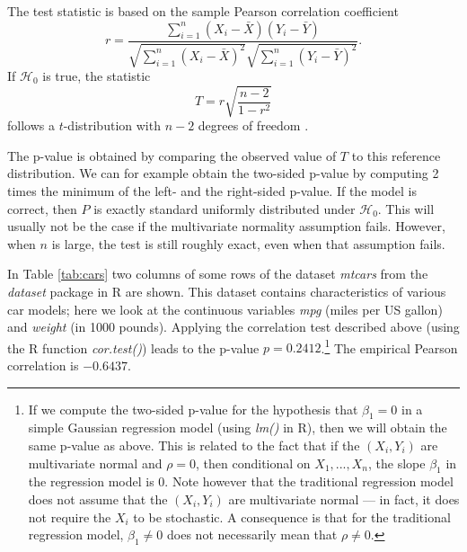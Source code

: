 \documentclass[11pt]{article}
\theoremstyle{plain}
\theoremstyle{definition}
\newcommand{\Hy}{\mathcal{H}}
\newcommand{\citp}{\citep}
\begin{document}
The test statistic is based on the sample Pearson correlation coefficient
\[
r = \frac{\sum_{i=1}^n (X_i - \bar X)(Y_i - \bar Y)}
{\sqrt{\sum_{i=1}^n (X_i - \bar X)^2}\sqrt{\sum_{i=1}^n (Y_i - \bar Y)^2}}.
\]
If $\Hy_0$ is true, the statistic
\[
T  = r \sqrt{\frac{n-2}{1-r^2}}
\]
follows a $t$-distribution with $n-2$ degrees of freedom \citp[][p.218]{lehmann2022testing}.


The p-value is obtained by comparing the observed value of $T$ to this reference distribution. 
We can for example obtain the two-sided p-value by computing 2 times the minimum of the left- and the right-sided p-value.
If the model is correct, then $P$ is exactly standard uniformly distributed under $\Hy_0$.  This will usually not be the case if the  multivariate normality assumption fails. However, when $n$ is large, the test is still roughly exact, even when that assumption fails.


In Table \ref{tab:cars} two columns of some  rows of the dataset \emph{mtcars} from the \emph{dataset} package in R are shown. This dataset contains characteristics of various car models; here we look at the continuous variables \emph{mpg} (miles per US gallon) and \emph{weight} (in 1000 pounds). Applying the correlation test described above (using the R function \emph{cor.test()}) leads to the p-value  $p= 0.2412$.\footnote{If we compute the two-sided p-value for the hypothesis that $\beta_1=0$ in a simple Gaussian regression model (using \emph{lm()} in R), then we will obtain the same p-value as above. This is related to the fact that if the $(X_i,Y_i)$ are multivariate normal and $\rho=0$, then conditional on $X_1,...,X_n$, the slope $\beta_1$ in the regression model is 0. 
Note however that the traditional regression model does not assume that the  $(X_i,Y_i)$ are multivariate normal --- in fact, it does not require the  $X_i$ to be stochastic. A consequence is that for the traditional regression model, $\beta_1\neq0$ does not necessarily mean that $\rho\neq0$. } The empirical Pearson correlation is $-0.6437$.

\end{document}
